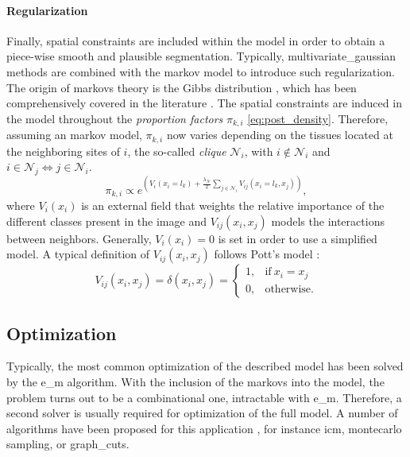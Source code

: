\paragraph{Regularization}
\label{sec:hmrf}
Finally, spatial constraints are included within the model in
  order to obtain a piece-wise smooth and plausible segmentation.
Typically, \gls*{multivariate_gaussian} methods are combined with the
  \gls*{markov} model to introduce such regularization.
The origin of \glspl*{markov} theory is the Gibbs distribution
  \citep{geman_stochastic_1984}, which has been comprehensively
  covered in the literature \citep{li_markov_2009}.
The spatial constraints are induced in the model throughout the 
  \emph{proportion factors} $\pi_{k,i}$ \eqref{eq:post_density}.
Therefore, assuming an \gls*{markov} model, $\pi_{k,i}$ now varies
  depending on the tissues located at the neighboring sites of $i$,
  the so-called \emph{clique} $\mathcal{N}_{i}$,
  with $i \notin \mathcal{N}_{i}$ and
  $i \in \mathcal{N}_{j} \iff j \in \mathcal{N}_{i}$.
\begin{equation}
\label{eq:hmrf_energy}
\pi_{k,i} \propto e^{\left(V_{i}(x_{i}=l_k)+\frac{\lambda_{\mathcal{N}}}{2}\underset{j\in\mathcal{N}_{i}}{\sum}V_{ij}(x_{i}=l_k,x_{j})\right)},
\end{equation}
where $V_{i}(x_{i})$ is an external field that weights the relative
  importance of the different classes present in the image and $V_{ij}(x_{i},x_{j})$
  models the interactions between neighbors.
Generally, $V_{i}(x_{i})=0$ is set in order to use a simplified model.
A typical definition of $V_{ij}(x_{i},x_{j})$ follows Pott's model
  \citep{zhang_segmentation_2001}:
\begin{equation}
\label{eq:potts_model}
V_{ij}(x_{i},x_{j})=\delta(x_{i},x_{j})=\begin{cases}
1, & \textrm{if}\: x_{i}=x_{j}\\
0, & \textrm{otherwise}.
\end{cases}
\end{equation}

\subsection{Optimization}
\label{sec:optimization}
Typically, the most common optimization of the described model has been
  solved by the \gls*{e_m} algorithm.
With the inclusion of the \glspl*{markov} into the model, the problem
  turns out to be a combinational one, intractable with \gls*{e_m}.
Therefore, a second solver is usually required for optimization
  of the full model.
A number of algorithms have been proposed for this application 
  \citep{bishop_pattern_2009}, for instance \gls*{icm},
  \gls*{montecarlo} sampling, or \gls*{graph_cuts}.

